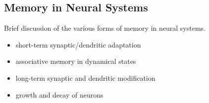 \subsection{\label{sec:memory}Memory in Neural Systems}

Brief discussion of the various forms of memory in neural systems.
\begin{itemize}
\item short-term synaptic/dendritic adaptation
\item associative memory in dynamical states
\item long-term synaptic and dendritic modification
\item growth and decay of neurons
\end{itemize}
